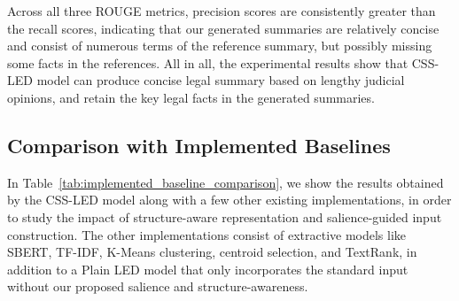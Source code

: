 \documentclass[11pt, a4paper]{article}
\theoremstyle{plain}%
\theoremstyle{remark}%
\theoremstyle{definition}%
\begin{document}
Across all three ROUGE metrics, precision scores are consistently greater than the recall scores, indicating that our generated summaries are relatively concise and consist of numerous terms of the reference summary, but possibly missing some facts in the references. All in all, the experimental results show that CSS-LED model can produce concise legal summary based on lengthy judicial opinions, and retain the key legal facts in the generated summaries.

\subsection{Comparison with Implemented Baselines}

In Table~\ref{tab:implemented_baseline_comparison}, we show the results obtained by the CSS-LED model along with a few other existing implementations, in order to study the impact of structure-aware representation and salience-guided input construction. The other implementations consist of extractive models like SBERT, TF-IDF, K-Means clustering, centroid selection, and TextRank, in addition to a Plain LED model that only incorporates the standard input without our proposed salience and structure-awareness.

\begin{table}[H]
\centering
\caption{Comparison of CSS-LED with implemented baseline models on the IN-ABS dataset.}
\label{tab:implemented_baseline_comparison}
\end{table}
\end{document}

